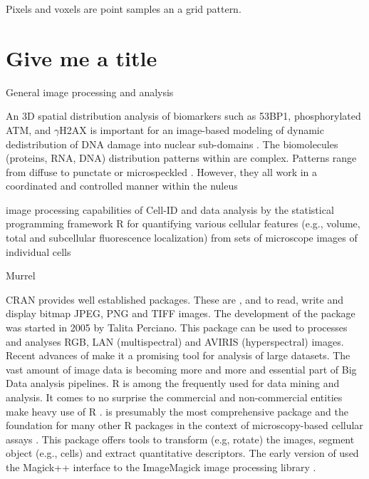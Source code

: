 Pixels and voxels are point samples an a grid pattern.


\section{Give me a title}

General image processing and analysis \citep{ljosa_introduction_2009}

An 3D spatial distribution analysis of biomarkers such as 53BP1, phosphorylated 
ATM, and $\gamma$H2AX  is important for an image-based modeling of dynamic 
dedistribution of DNA damage into nuclear sub-domains 
\citep{costes_image-based_2007}. The biomolecules (proteins, RNA, DNA) distribution patterns within are complex. 
Patterns range from diffuse to punctate or microspeckled 
\citep{shiels_quantitative_2007, willitzki_new_2012}. However, they all work in a coordinated and controlled 
manner within the nuleus \citep{shiels_quantitative_2007}

image processing capabilities of Cell-ID and data analysis by the statistical 
programming framework R for quantifying various cellular features (e.g., volume, 
total and subcellular fluorescence localization) from sets of microscope 
images of individual cells \citep{bush_using_2012}

\citep{tabelow_modeling_2012, tabelow_dti:_2014}

Murrel \citep{murrell_raster_2011}
 \citep{clayden_mmand:_2016}

CRAN provides well established packages. These are ,  
and  to read, write and display bitmap JPEG, PNG and TIFF images. 
The development of the  \citep{frery_introduction_2013, perciano_ripa:_2014} package was 
started in 2005 by Talita Perciano. This package can be used to processes and 
analyses RGB, LAN (multispectral) and AVIRIS (hyperspectral) images. Recent 
advances of  make it a promising tool for analysis of large 
datasets. The vast amount of image data is becoming more and more and essential 
part of Big Data analysis pipelines. R is among the frequently used for data 
mining and analysis. It comes to no surprise the commercial and non-commercial 
entities make heavy use of R \citep{chen_big_2014}.  
\citep{pau_ebimager_2010} is presumably the most comprehensive package and the 
foundation for many other R packages in the context of microscopy-based cellular 
assays \citep{gowen_near_2015}. This package offers tools to transform (e.g, 
rotate) the images, segment object (e.g., cells) and extract quantitative 
descriptors. The early version of  used the Magick++ interface 
to the ImageMagick image processing library \citep{sklyar_image_2006}.

